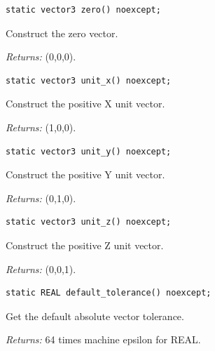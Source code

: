 \par\noindent\begin{minipage}{\linewidth}
\begin{lstlisting}[style=apireference]
static vector3 zero() noexcept;
\end{lstlisting}
{\footnotesize Construct the zero vector.\par}
{\footnotesize\textit{Returns:} (0,0,0).\par}
\end{minipage}\par\vspace{1pt}
\par\noindent\begin{minipage}{\linewidth}
\begin{lstlisting}[style=apireference]
static vector3 unit_x() noexcept;
\end{lstlisting}
{\footnotesize Construct the positive X unit vector.\par}
{\footnotesize\textit{Returns:} (1,0,0).\par}
\end{minipage}\par\vspace{1pt}
\par\noindent\begin{minipage}{\linewidth}
\begin{lstlisting}[style=apireference]
static vector3 unit_y() noexcept;
\end{lstlisting}
{\footnotesize Construct the positive Y unit vector.\par}
{\footnotesize\textit{Returns:} (0,1,0).\par}
\end{minipage}\par\vspace{1pt}
\par\noindent\begin{minipage}{\linewidth}
\begin{lstlisting}[style=apireference]
static vector3 unit_z() noexcept;
\end{lstlisting}
{\footnotesize Construct the positive Z unit vector.\par}
{\footnotesize\textit{Returns:} (0,0,1).\par}
\end{minipage}\par\vspace{1pt}
\par\noindent\begin{minipage}{\linewidth}
\begin{lstlisting}[style=apireference]
static REAL default_tolerance() noexcept;
\end{lstlisting}
{\footnotesize Get the default absolute vector tolerance.\par}
{\footnotesize\textit{Returns:} 64 times machine epsilon for REAL.\par}
\end{minipage}\par\vspace{1pt}
